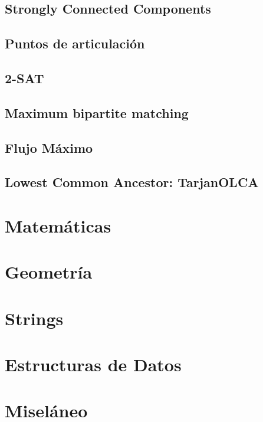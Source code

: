 \documentclass[10pt,letterpaper,twocolumn,twosided]{article}
\begin{document}
\subsection{Strongly Connected Components}

\subsection{Puntos de articulación}

\subsection{2-SAT}

\subsection{Maximum bipartite matching}

\subsection{Flujo Máximo}

\subsection{Lowest Common Ancestor: TarjanOLCA}

\section{Matemáticas}

\section{Geometría}

\section{Strings}


\section{Estructuras de Datos}

\section{Miseláneo}
\end{document}

